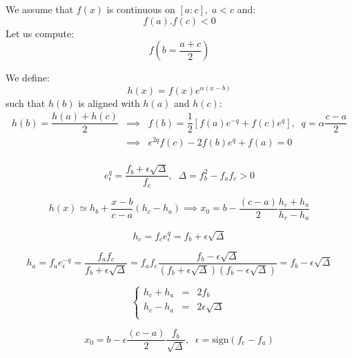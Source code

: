 \documentclass[aps,12pt]{revtex4}
\begin{document}
We assume that $f(x)$ is continuous on $[a:c],\;a<c$ 
and:
\begin{equation}
	f(a).f(c) < 0
\end{equation}
Let us compute:
\begin{equation}
	f\left(b=\frac{a+c}{2}\right)
\end{equation}

We define:
\begin{equation}
	h(x) = f(x) e^{\alpha(x-b)}
\end{equation}
such that $h(b)$ is aligned with $h(a)$ and $h(c)$:
\begin{equation}
\begin{array}{rcl}
	h(b) = \dfrac{h(a)+h(c)}{2} & \implies & f(b) = \dfrac{1}{2} \left[ f(a) e^{-q}+ f(c) e^{q}\right], \;\; q=\alpha\dfrac{c-a}{2}\\
	& \implies & e^{2q} f(c) - 2 f(b) e^q + f(a) = 0\\
\end{array}
\end{equation}
	
\begin{equation}
e^q_\epsilon = \dfrac{f_b+\epsilon\sqrt\Delta}{f_c}, \;\; \Delta=f_b^2 - f_a f_c > 0
\end{equation}

\begin{equation}
	h(x) \simeq h_b + \dfrac{x-b}{c-a} (h_c-h_a) \implies x_0 = b - \dfrac{(c-a)}{2} \dfrac{h_c+h_a}{h_c-h_a}
\end{equation}

\begin{equation}
	h_c = f_c e^q_\epsilon = f_b + \epsilon \sqrt\Delta
\end{equation}

\begin{equation}
	h_a = f_a  e^{-q}_\epsilon = \dfrac{f_a f_c}{f_b+\epsilon\sqrt\Delta} = f_a f_c \dfrac{f_b-\epsilon\sqrt\Delta}{(f_b+\epsilon\sqrt\Delta)(f_b-\epsilon\sqrt\Delta)}
	= f_b - \epsilon \sqrt\Delta
\end{equation}

\begin{equation}
\left\lbrace
\begin{array}{rcl}
	h_c + h_a & = &  2 f_b\\
	h_c - h_a & = & 2 \epsilon \sqrt\Delta\\
\end{array}
\right.
\end{equation}

\begin{equation}
	x_0 = b - \epsilon \dfrac{(c-a)}{2} \dfrac{f_b}{\sqrt\Delta}, \;\; \epsilon =  \mathrm{sign}(f_c-f_a)
\end{equation}
\end{document}
